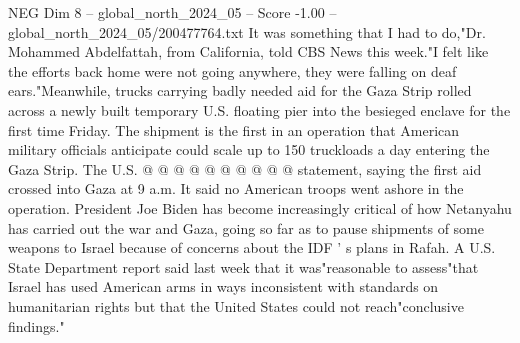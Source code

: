 \begin{textsample}{NEG Dim 8 – global\_north\_2024\_05 – Score -1.00 – global\_north\_2024\_05/200477764.txt}
It was something that I had to do,"Dr.
Mohammed Abdelfattah, from California, told CBS News this week."I felt like the efforts back home were not going anywhere, they were falling on deaf ears."Meanwhile, trucks carrying badly needed aid for the Gaza Strip rolled across a newly built temporary U.S. floating pier into the besieged enclave for the first time Friday.
The shipment is the first in an operation that American military officials anticipate could scale up to 150 truckloads a day entering the Gaza Strip.
The U.S. @ @ @ @ @ @ @ @ @ @ statement, saying the first aid crossed into Gaza at 9 a.m.
It said no American troops went ashore in the operation.
President Joe Biden has become increasingly critical of how Netanyahu has carried out the war and Gaza, going so far as to pause shipments of some weapons to Israel because of concerns about the IDF ' s plans in Rafah.
A U.S.
State Department report said last week that it was"reasonable to assess"that Israel has used American arms in ways inconsistent with standards on humanitarian rights but that the United States could not reach"conclusive findings."

\end{textsample}

